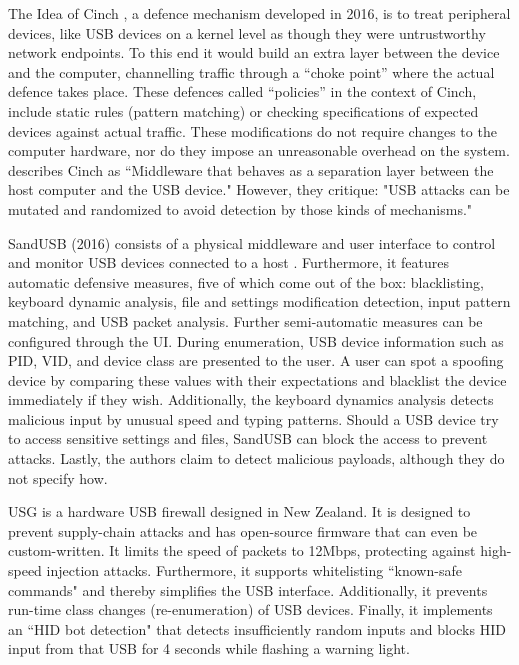 The Idea of Cinch \cite{angelDefendingMaliciousPeripherals2016}, a defence mechanism developed in 2016, is to treat peripheral devices, like USB devices on a kernel level as though they were untrustworthy network endpoints. To this end it would build an extra layer between the device and the computer, channelling traffic through a ``choke point'' where the actual defence takes place. These defences called ``policies'' in the context of Cinch, include static rules (pattern matching) or checking specifications of expected devices against actual traffic. 
These modifications do not require changes to the computer hardware, nor do they impose an unreasonable overhead on the system.
\cite{farhiMalboardNovelUser2019} describes Cinch as ``Middleware that behaves as a separation layer between the host computer and the USB device." However, they critique: "USB attacks can be mutated and randomized to avoid detection by those kinds of mechanisms." \cite[p.~7]{farhiMalboardNovelUser2019}

SandUSB (2016) consists of a physical middleware and user interface to control and monitor USB devices connected to a host \cite{loeSandUSBInstallationfreeSandbox2016}. Furthermore, it features automatic defensive measures, five of which come out of the box: blacklisting, keyboard dynamic analysis, file and settings modification detection, input pattern matching, and USB packet analysis. Further semi-automatic measures can be configured through the UI. 
During enumeration, USB device information such as PID, VID, and device class are presented to the user. A user can spot a spoofing device by comparing these values with their expectations and blacklist the device immediately if they wish.
Additionally, the keyboard dynamics analysis detects malicious input by unusual speed and typing patterns. Should a USB device try to access sensitive settings and files, SandUSB can block the access to prevent attacks. Lastly, the authors claim to detect malicious payloads, although they do not specify how. 

USG \cite{robertfiskRobertfiskUSG2016} is a hardware USB firewall designed in New Zealand. It is designed to prevent supply-chain attacks and has open-source firmware that can even be custom-written. It limits the speed of packets to 12Mbps, protecting against high-speed injection attacks. Furthermore, it supports whitelisting ``known-safe commands" and thereby simplifies the USB interface. Additionally, it prevents run-time class changes (re-enumeration) of USB devices. Finally, it implements an ``HID bot detection" that detects insufficiently random inputs and blocks HID input from that USB for 4 seconds while flashing a warning light. 

